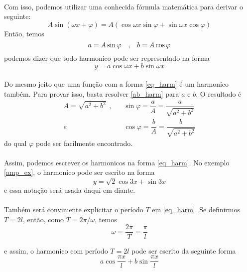 \\
Com isso, podemos utilizar uma conhecida fórmula matemática para derivar
o seguinte:\\
\begin{equation}
    A\sin{(\omega x + \varphi)} = A(\cos{\omega x}\sin{\varphi} + \sin{\omega x}\cos{\varphi})
\end{equation}
Então, temos\\
\begin{equation}
\label{ab_harm}
    a = A\sin{\varphi}\text{\hspace{10pt},\hspace{10pt}}b = A\cos{\varphi}
\end{equation}
podemos dizer que todo harmonico pode ser representado na forma
\begin{equation}
\label{eq_harm}
    y = a\cos{\omega x} + b\sin{\omega x}
\end{equation}
\\
Do mesmo jeito que uma função com a forma \ref{eq_harm} é um harmonico também. 
Para provar isso, basta resolver \ref{ab_harm} para $a$ e $b$. O resultado é
\begin{equation}
    \begin{split}
        A = \sqrt{a^2 + b^2}\hspace{5pt},\hspace{10pt} &\sin{\varphi} = \dfrac{a}{A} = \dfrac{a}{\sqrt{a^2 + b^2}}\\
        e\hspace{10pt} & \cos{\varphi} = \dfrac{b}{A} = \dfrac{b}{\sqrt{a^2 + b^2}}
    \end{split}
\end{equation} 
do qual $\varphi$ pode ser facilmente encontrado.\\
\\
Assim, podemos escrever os harmonicos na forma \ref{eq_harm}. No exemplo \ref{amp_ex},
o harmonico pode ser escrito na forma\\
\begin{equation}
    y = \sqrt{2}\cos{3x}+\sin{3x}
\end{equation} 
e essa notação será usada daqui em diante.\\
\\
Também será conviniente explicitar o período $T$ em \ref{eq_harm}. Se definirmos
$T = 2l$, então, como $T = 2\pi/\omega$, temos
\begin{equation}
    \omega = \dfrac{2\pi}{T}=\dfrac{\pi}{l}
\end{equation}

e assim, o harmonico com período $T=2l$ pode ser escrito da seguinte forma\\
\begin{equation}
    a\cos{\dfrac{\pi x}{l}} + b\sin{\dfrac{\pi x}{l}}
\end{equation}